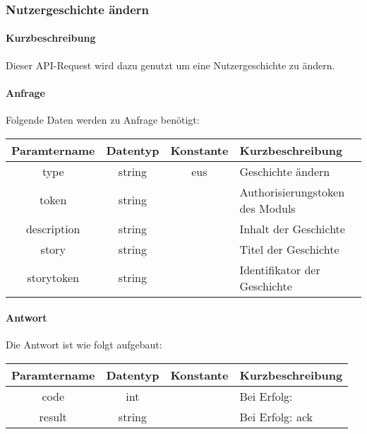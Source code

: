 \subsubsection{Nutzergeschichte ändern}
\paragraph{Kurzbeschreibung}Dieser API-Request wird dazu genutzt um eine Nutzergeschichte zu ändern.
\paragraph{Anfrage}Folgende Daten werden zu Anfrage benötigt:
\begin{table}[H]
	\begin{tabular}{|c|c|c|p{6.5cm}|}
		\hline
		\textbf{Paramtername} & \textbf{Datentyp} & \textbf{Konstante} & \textbf{Kurzbeschreibung}                                                                                               \\ \hline
		type                & string            & eus                & Geschichte ändern \\ \hline
		token               & string            &                    & Authorisierungstoken des Moduls \\ \hline
		description         & string            &                    & Inhalt der Geschichte \\ \hline
		story               & string            &                    & Titel der Geschichte \\ \hline
		storytoken          & string            &                    & Identifikator der Geschichte \\ \hline
	\end{tabular}
\end{table}
\paragraph{Antwort}Die Antwort ist wie folgt aufgebaut:
\begin{table}[H]
	\begin{tabular}{|c|c|c|p{6.5cm}|}
		\hline
		\textbf{Paramtername} & \textbf{Datentyp} & \textbf{Konstante} & \textbf{Kurzbeschreibung}            \\ \hline                
		code                & int              &                 & Bei Erfolg: {\glqq 0\grqq} \\ \hline
		result              & string           &                 & Bei Erfolg: {\glqq ack\grqq} \\ \hline
	\end{tabular}
\end{table}
